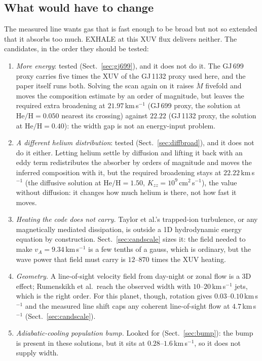 \documentclass[english,a4paper]{my_memo}
\begin{document}
\subsection{What would have to change}

The measured line wants gas that is fast enough to be broad but not so
extended that it absorbs too much. EXHALE at this XUV flux delivers neither.
The candidates, in the order they should be tested:

\begin{enumerate}
\item \emph{More energy}: tested (Sect.~\ref{sec:gj699}), and it does
      not do it. The GJ\,699 proxy carries five times the XUV of the
      GJ\,1132 proxy used here, and the paper itself runs both. Solving the
      scan again on it raises $\dot M$ fivefold and moves the composition
      estimate by an order of magnitude, but leaves the required extra
      broadening at $21.97$\,km\,s$^{-1}$ (GJ\,699 proxy, the solution at
      $\mathrm{He/H} = 0.050$ nearest its crossing) against $22.22$
      (GJ\,1132 proxy, the solution at $\mathrm{He/H} = 0.40$): the width
      gap is not an energy-input problem.
\item \emph{A different helium distribution}: tested
      (Sect.~\ref{sec:diffbroad}), and it does not do it either. Letting
      helium settle by diffusion and lifting it back with an eddy term
      redistributes the absorber by orders of magnitude and moves the
      inferred composition with it, but the required broadening stays at
      $22.22$\,km\,s$^{-1}$ (the diffusive solution at
      $\mathrm{He/H} = 1.50$, $K_{zz} = 10^{9}$\,cm$^2$\,s$^{-1}$), the value
      without diffusion: it changes how much helium is there, not how fast
      it moves.
\item \emph{Heating the code does not carry.} Taylor et al.'s trapped-ion
      turbulence, or any magnetically mediated dissipation, is outside a
      1D hydrodynamic energy equation by construction. Sect.~\ref{sec:candscale}
      sizes it: the field needed to make $v_A = 9.34$\,km\,s$^{-1}$ is a
      few tenths of a gauss, which is ordinary, but the wave power that field
      must carry is $12$--$870$ times the XUV heating.
\item \emph{Geometry.} A line-of-sight velocity field from day-night or
      zonal flow is a 3D effect; Rumenskikh et al.\ reach the observed width
      with $10$--$20$\,km\,s$^{-1}$ jets, which is the right order. For this
      planet, though, rotation gives $0.03$--$0.10$\,km\,s$^{-1}$ and the
      measured line shift caps any coherent line-of-sight flow at
      $4.7$\,km\,s$^{-1}$ (Sect.~\ref{sec:candscale}).
\item \emph{Adiabatic-cooling population bump.} Looked for
      (Sect.~\ref{sec:bump}): the bump is present in these solutions, but
      it sits at $0.28$--$1.6$\,km\,s$^{-1}$, so it does not supply width.
\end{enumerate}
\end{document}
